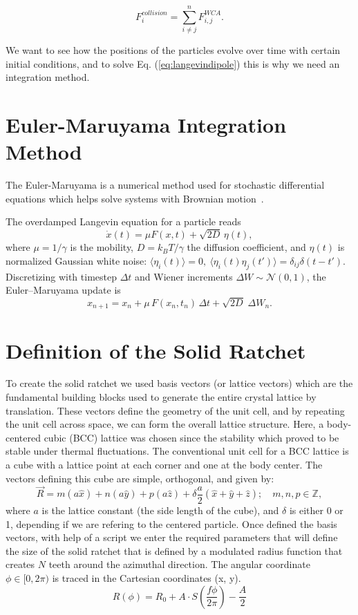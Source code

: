 \begin{equation}
  F^{collision}_i = \sum^{n}_{i \neq j} F^{WCA}_{i,j}.  
  \label{eq:wcasum}
\end{equation}

We want to see how the positions of the particles evolve over time with certain initial conditions, and to solve Eq. (\ref{eq:langevindipole}) this is why we need an integration method.

\section{Euler-Maruyama Integration Method}
The Euler-Maruyama is a numerical method used for stochastic differential equations which helps solve systems with Brownian motion~\cite{platen2010numerical,higham2001algorithmic}.

The overdamped Langevin equation for a particle reads
\[
\dot{x}(t)=\mu F(x,t)+\sqrt{2D}\,\eta(t),
\]
where \(\mu=1/\gamma\) is the mobility, \(D=k_BT/\gamma\) the diffusion coefficient,
and \(\eta(t)\) is normalized Gaussian white noise:
\(\langle\eta_i(t)\rangle=0,\ \langle\eta_i(t)\eta_j(t')\rangle=\delta_{ij}\delta(t-t')\).
Discretizing with timestep \(\Delta t\) and Wiener increments \(\Delta W\sim\mathcal N(0, 1)\),
the Euler--Maruyama update is
\begin{equation}
x_{n+1} =  x_n + \mu\, F( x_n,t_n)\,\Delta t
  + \sqrt{2D}\;\Delta W_n.
\label{eq:em_overdamped}
\end{equation}
\section{Definition of the Solid Ratchet}

To create the solid ratchet we used basis vectors (or lattice vectors) which are the fundamental building blocks used to generate the entire crystal lattice by translation. These vectors define the geometry of the unit cell, and by repeating the unit cell across space, we can form the overall lattice structure. Here, a body-centered cubic (BCC) lattice was chosen since the stability which proved to be stable under thermal fluctuations.
The conventional unit cell for a BCC lattice is a cube with a lattice point at each corner and one at the body center. The vectors defining this cube are simple, orthogonal, and given by:
%
\begin{equation}
  \vec{R} = m(a\hat{x}) + n(a\hat{y}) + p(a\hat{z}) + \delta \frac{a}{2}(\hat{x} + \hat{y} + \hat{z}); \quad m,n,p \in \mathbb{Z},
\end{equation}
%
where \( a \) is the lattice constant (the side length of the cube), and $\delta$ is either 0 or 1, depending if we are refering to the centered particle. Once defined the basis vectors, with help of a script we enter the required parameters that will define the size of the solid ratchet that is defined by a modulated radius function that creates $N$ teeth around the azimuthal direction. The angular coordinate $\phi \in [0, 2\pi)$ is traced in the Cartesian coordinates (x, y).
\begin{equation}
R(\phi) = R_0 + A \cdot S\left(\frac{f\phi}{2\pi}\right) - \frac{A}{2}
\end{equation}

